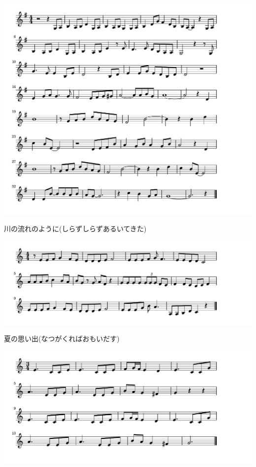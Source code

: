 \documentclass[a4paper]{ltjsarticle}
\begin{document}
\includegraphics[clip]{kawanonagare_crop.pdf}

\vspace{-10mm} \hspace{10mm}
川の流れのように(しらずしらずあるいてきた)

\includegraphics[clip]{natsunoomoide_crop.pdf}

\vspace{-10mm} \hspace{10mm}
夏の思い出(なつがくればおもいだす)

\includegraphics[clip]{waltzbrahms_crop.pdf}
\end{document}
